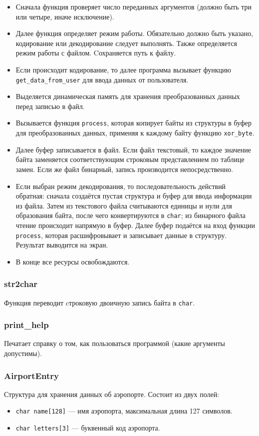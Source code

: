 \begin{itemize}
    \item Сначала функция проверяет число переданных аргументов (должно быть три или четыре, иначе исключение).
    \item Далее функция определяет режим работы. Обязательно должно быть указано, кодирование или декодирование следует выполнять. Также определяется режим работы с файлом. Cохраняется путь к файлу.
    \item Если происходит кодирование, то далее программа вызывает функцию \\ \verb|get_data_from_user| для ввода данных от пользователя.
    \item Выделяется динамическая память для хранения преобразованных данных перед записью в файл.
    \item Вызывается функция \verb|process|, которая копирует байты из структуры в буфер для преобразованных данных, применяя к каждому байту функцию \verb|xor_byte|.
    \item Далее буфер записывается в файл. Если файл текстовый, то каждое значение байта заменяется соответствующим строковым представлением по таблице замен. Если же файл бинарный, запись производится непосредственно.
    \item Если выбран режим декодирования, то последовательность действий обратная: сначала создаётся пустая структура и буфер для ввода информации из файла. Затем из текстового файла считываются единицы и нули для образования байта, после чего конвертируются в \verb|char|; из бинарного файла чтение происходит напрямую в буфер. Далее буфер подаётся на вход функции \verb|process|, которая расшифровывает и записывает данные в структуру. Результат выводится на экран.
    \item В конце все ресурсы освобождаются.
\end{itemize}


\subsubsection{str2char}
Функция переводит cтроковую двоичную запись байта в \verb|char|.

\subsubsection{print\_help}
Печатает справку о том, как пользоваться программой (какие аргументы допустимы).

\subsubsection{AirportEntry}
Структура для хранения данных об аэропорте. Состоит из двух полей:
\begin{itemize}
    \item \texttt{char name[128]} — имя аэропорта, максимальная длина 127 символов.
    \item \texttt{char letters[3]} — буквенный код аэропорта.
\end{itemize}

